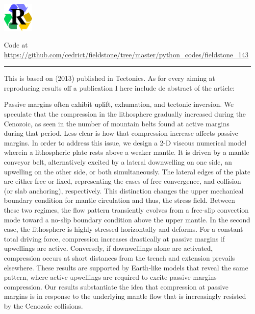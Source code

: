 
\includegraphics[width=1.5cm]{images/pictograms/replication}



\begin{center}
Code at \url{https://github.com/cedrict/fieldstone/tree/master/python_codes/fieldstone_143}
\end{center}

\par\noindent\rule{\textwidth}{0.4pt}


This \stone is based on \textcite{yahb13} (2013) published in Tectonics.
As for every \stone aiming at reproducing results off a publication I here include de abstract
of the article:

\begin{center}
\begin{minipage}{13cm}
{\small 
Passive margins often exhibit uplift, exhumation, and tectonic inversion. We speculate
that the compression in the lithosphere gradually increased during the Cenozoic, as seen in
the number of mountain belts found at active margins during that period. Less clear is how
that compression increase affects passive margins. In order to address this issue, we design a
2-D viscous numerical model wherein a lithospheric plate rests above a weaker mantle. It is
driven by a mantle conveyor belt, alternatively excited by a lateral downwelling on one side,
an upwelling on the other side, or both simultaneously. The lateral edges of the plate are
either free or fixed, representing the cases of free convergence, and collision (or slab
anchoring), respectively. This distinction changes the upper mechanical boundary condition
for mantle circulation and thus, the stress field. Between these two regimes, the flow pattern
transiently evolves from a free-slip convection mode toward a no-slip boundary condition
above the upper mantle. In the second case, the lithosphere is highly stressed horizontally
and deforms. For a constant total driving force, compression increases drastically at passive
margins if upwellings are active. Conversely, if downwellings alone are activated,
compression occurs at short distances from the trench and extension prevails elsewhere.
These results are supported by Earth-like models that reveal the same pattern, where active
upwellings are required to excite passive margins compression. Our results substantiate the
idea that compression at passive margins is in response to the underlying mantle flow that is
increasingly resisted by the Cenozoic collisions.}
\end{minipage}
\end{center}
 




